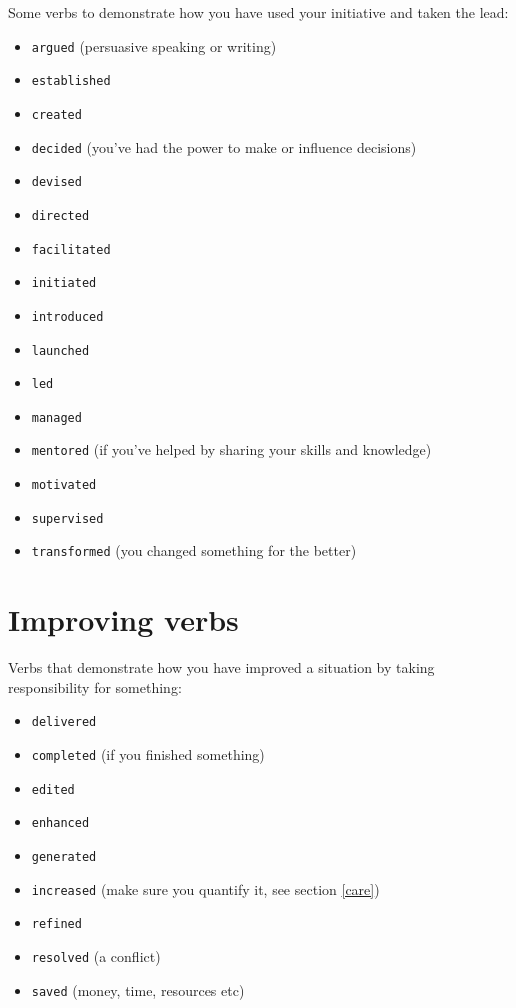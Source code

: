 \documentclass[
]{book}
\providecommand{\tightlist}{%
  \setlength{\itemsep}{0pt}\setlength{\parskip}{0pt}}
\begin{document}
Some verbs to demonstrate how you have used your initiative and taken the lead:

\begin{itemize}
\tightlist
\item
  \texttt{argued} (persuasive speaking or writing)
\item
  \texttt{established}
\item
  \texttt{created}
\item
  \texttt{decided} (you've had the power to make or influence decisions)
\item
  \texttt{devised}
\item
  \texttt{directed}
\item
  \texttt{facilitated}
\item
  \texttt{initiated}
\item
  \texttt{introduced}
\item
  \texttt{launched}
\item
  \texttt{led}
\item
  \texttt{managed}
\item
  \texttt{mentored} (if you've helped by sharing your skills and knowledge)
\item
  \texttt{motivated}
\item
  \texttt{supervised}
\item
  \texttt{transformed} (you changed something for the better)
\end{itemize}

\hypertarget{improving}{%
\section{Improving verbs}\label{improving}}

Verbs that demonstrate how you have improved a situation by taking responsibility for something:

\begin{itemize}
\tightlist
\item
  \texttt{delivered}
\item
  \texttt{completed} (if you finished something)
\item
  \texttt{edited}
\item
  \texttt{enhanced}
\item
  \texttt{generated}
\item
  \texttt{increased} (make sure you quantify it, see section \ref{care})
\item
  \texttt{refined}
\item
  \texttt{resolved} (a conflict)
\item
  \texttt{saved} (money, time, resources etc)
\end{itemize}
\end{document}
